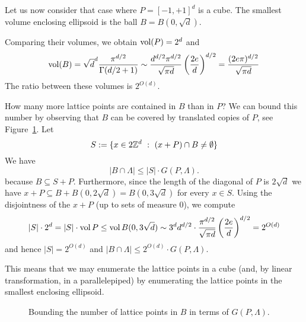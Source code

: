 \begin{example}
  \label{example:cover-the-ball-with-cubes}
  Let us now consider that case where $P = [-1,+1]^d$ is a cube.
  The smallest volume enclosing ellipsoid is the ball $B = B(0, \sqrt{d})$.
  \begin{center}
  \end{center}
  Comparing their volumes, we obtain $\operatorname{vol}(P) = 2^d$ and
  \[
    \operatorname{vol}(B) = \sqrt{d}^d \frac{\pi^{d/2}}{\Gamma(d/2+1)} \sim \frac{d^{d/2} \pi^{d/2}}{\sqrt{\pi d}} \left( \frac{2e}{d} \right)^{d/2}
      = \frac{(2 e \pi)^{d/2}}{\sqrt{\pi d}}
  \]
  The ratio between these volumes is $2^{O(d)}$.

  How many more lattice points are contained in $B$ than in $P$?
  We can bound this number by observing that $B$ can be covered by translated copies of $P$,
  see Figure~\ref{fig:cover-B-by-P}.
  Let
  \[
    S := \{ x \in 2\mathbb{Z}^d ~:~ (x + P) \cap B \neq \emptyset \}
  \]
  We have
  \[
    |B \cap \Lambda| \leq |S| \cdot G(P, \Lambda).
  \]
  because $B \subseteq S + P$.
  Furthermore,
  since the length of the diagonal of $P$ is $2\sqrt{d}$
  we have $x + P \subseteq B + B(0,2\sqrt{d}) = B(0,3\sqrt{d})$ for every $x \in S$.
  Using the disjointness of the $x + P$ (up to sets of measure $0$),
  we compute
  \[
    |S| \cdot 2^d = |S| \cdot \operatorname{vol} P \leq \operatorname{vol} B(0,3\sqrt{d}) \sim 3^d d^{d/2} \cdot \frac{\pi^{d/2}}{\sqrt{\pi d}} \left( \frac{2e}{d} \right)^{d/2}
    = 2^{O(d)}
  \]
  and hence $|S| = 2^{O(d)}$ and $|B \cap \Lambda| \leq 2^{O(d)} \cdot G(P, \Lambda)$.
  
  This means that we may enumerate the lattice points in a cube
  (and, by linear transformation, in a parallelepiped)
  by enumerating the lattice points in the smallest enclosing ellipsoid.
\end{example}
\begin{figure}
  \begin{center}
  \end{center}
  \caption{Bounding the number of lattice points in $B$ in terms of $G(P,\Lambda)$.}
  \label{fig:cover-B-by-P}
\end{figure}


